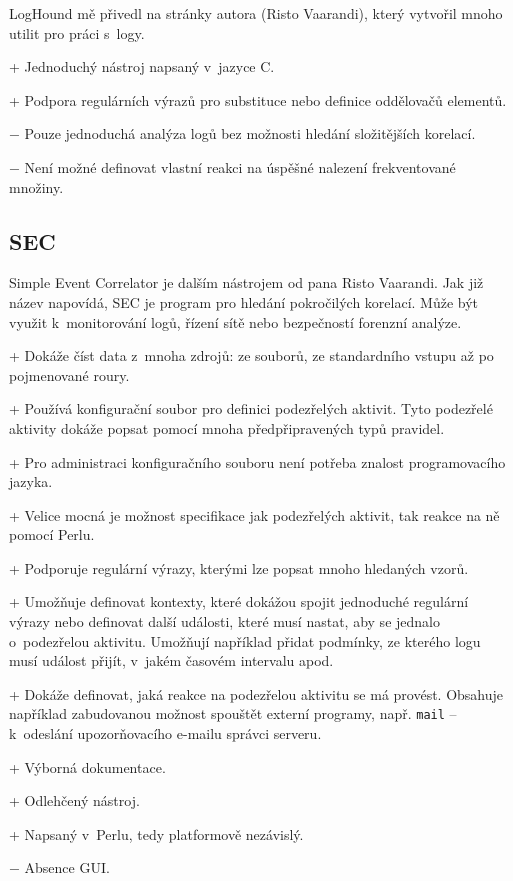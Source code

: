 \documentclass[thesis=B,czech]{FITthesis}[2012/06/26]
\begin{document}
LogHound mě přivedl na stránky autora (Risto Vaarandi), který vytvořil mnoho utilit pro práci s~logy.	
	
+ Jednoduchý nástroj napsaný v~jazyce C.
	
+ Podpora regulárních výrazů pro substituce nebo definice oddělovačů elementů.
	
$-$ Pouze jednoduchá analýza logů bez možnosti hledání složitějších korelací.
	
$-$ Není možné definovat vlastní reakci na úspěšné nalezení frekventované množiny.

 
\subsection{SEC}
Simple Event Correlator je dalším nástrojem od pana Risto Vaarandi. Jak již název napovídá, SEC je program pro hledání pokročilých korelací. Může být využit k~monitorování logů, řízení sítě nebo bezpečností forenzní analýze. \cite{secManPage, insiderThreatDetection}
	
+ Dokáže číst data z~mnoha zdrojů: ze souborů, ze standardního vstupu až po pojmenované roury.
		
+ Používá konfigurační soubor pro definici podezřelých aktivit. Tyto podezřelé aktivity dokáže popsat pomocí mnoha předpřipravených typů pravidel.
	
+ Pro administraci konfiguračního souboru není potřeba znalost programovacího jazyka.

+ Velice mocná je možnost specifikace jak podezřelých aktivit, tak reakce na ně pomocí Perlu.	

+ Podporuje regulární výrazy, kterými lze popsat mnoho hledaných vzorů.
	
+ Umožňuje definovat kontexty, které dokážou spojit jednoduché regulární výrazy nebo definovat další události, které musí nastat, aby se jednalo o~podezřelou aktivitu. Umožňují například přidat podmínky, ze kterého logu musí událost přijít, v~jakém časovém intervalu apod.
	
+ Dokáže definovat, jaká reakce na podezřelou aktivitu se má provést. Obsahuje například zabudovanou možnost spouštět externí programy, např. \texttt{mail} -- k~odeslání upozorňovacího e-mailu správci serveru.
		
+ Výborná dokumentace.
	
+ Odlehčený nástroj.
	
+ Napsaný v~Perlu, tedy platformově nezávislý.

$-$ Absence GUI.
	
\end{document}
